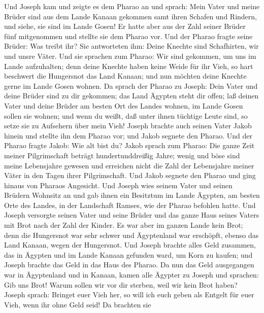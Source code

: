  Und Joseph kam und zeigte es dem Pharao an und sprach:
Mein Vater und meine Brüder sind aus dem Lande Kanaan gekommen samt
ihren Schafen und Rindern, und siehe, sie sind im Lande Gosen!
 Er hatte aber aus der Zahl seiner Brüder fünf mitgenommen
und stellte sie dem Pharao vor.  Und der Pharao fragte
seine Brüder: Was treibt ihr? Sie antworteten ihm: Deine Knechte sind
Schafhirten, wir und unsre Väter.  Und sie sprachen zum
Pharao: Wir sind gekommen, um uns im Lande aufzuhalten; denn deine
Knechte haben keine Weide für ihr Vieh, so hart beschwert die Hungersnot
das Land Kanaan; und nun möchten deine Knechte gerne im Lande Gosen
wohnen.  Da sprach der Pharao zu Joseph: Dein Vater und
deine Brüder sind zu dir gekommen;  das Land Ägypten steht
dir offen; laß deinen Vater und deine Brüder am besten Ort des Landes
wohnen, im Lande Gosen sollen sie wohnen; und wenn du weißt, daß unter
ihnen tüchtige Leute sind, so setze sie zu Aufsehern über mein Vieh!
 Joseph brachte auch seinen Vater Jakob hinein und stellte
ihn dem Pharao vor; und Jakob segnete den Pharao.  Und der
Pharao fragte Jakob: Wie alt bist du?  Jakob sprach zum
Pharao: Die ganze Zeit meiner Pilgrimschaft beträgt hundertunddreißig
Jahre; wenig und böse sind meine Lebensjahre gewesen und erreichen nicht
die Zahl der Lebensjahre meiner Väter in den Tagen ihrer Pilgrimschaft.
 Und Jakob segnete den Pharao und ging hinaus von Pharaos
Angesicht.  Und Joseph wies seinem Vater und seinen
Brüdern Wohnsitz an und gab ihnen ein Besitztum im Lande Ägypten, am
besten Orte des Landes, in der Landschaft Ramses, wie der Pharao
befohlen hatte.  Und Joseph versorgte seinen Vater und
seine Brüder und das ganze Haus seines Vaters mit Brot nach der Zahl der
Kinder.  Es war aber im ganzen Lande kein Brot; denn die
Hungersnot war sehr schwer und Ägyptenland war erschöpft, ebenso das
Land Kanaan, wegen der Hungersnot.  Und Joseph brachte
alles Geld zusammen, das in Ägypten und im Lande Kanaan gefunden ward,
um Korn zu kaufen; und Joseph brachte das Geld in das Haus des Pharao.
 Da nun das Geld ausgegangen war in Ägyptenland und in
Kanaan, kamen alle Ägypter zu Joseph und sprachen: Gib uns Brot! Warum
sollen wir vor dir sterben, weil wir kein Brot haben? 
Joseph sprach: Bringet euer Vieh her, so will ich euch geben als Entgelt
für euer Vieh, wenn ihr ohne Geld seid!  Da brachten sie
